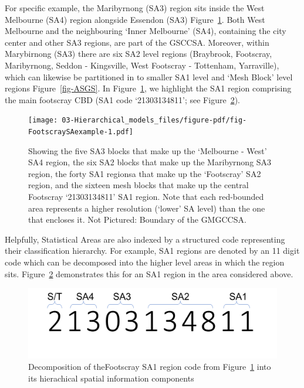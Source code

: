 \documentclass[
  letterpaper,
  DIV=11,
  numbers=noendperiod]{scrreprt}
\begin{document}
For specific example, the Maribyrnong (SA3) region sits inside the West
Melbourne (SA4) region alongside Essendon (SA3)
Figure~\ref{fig-FootscraySAexample}. Both West Melbourne and the
neighbouring `Inner Melbourne' (SA4), containing the city center and
other SA3 regions, are part of the GSCCSA. Moreover, within Marybirnong
(SA3) there are six SA2 level regions (Braybrook, Footscray,
Maribyrnong, Seddon - Kingsville, West Footscray - Tottenham,
Yarraville), which can likewise be partitioned in to smaller SA1 level
and `Mesh Block' level regions Figure~\ref{fig-ASGS}. In
Figure~\ref{fig-FootscraySAexample}, we highlight the SA1 region
comprising the main footscray CBD (SA1 code `21303134811'; see
Figure~\ref{fig-FootscraySA1Code}).

\begin{figure}

{\centering \texttt{[image: 03-Hierarchical\_models\_files/figure-pdf/fig-FootscraySAexample-1.pdf]}

}

\caption{\label{fig-FootscraySAexample}Showing the five SA3 blocks that
make up the `Melbourne - West' SA4 region, the six SA2 blocks that make
up the Maribyrnong SA3 region, the forty SA1 regionsa that make up the
`Footscray' SA2 region, and the sixteen mesh blocks that make up the
central Footscray `21303134811' SA1 region. Note that each red-bounded
area represents a higher resolution (`lower' SA level) than the one that
encloses it. Not Pictured: Boundary of the GMGCCSA.}

\end{figure}

Helpfully, Statistical Areas are also indexed by a structured code
representing their classification hierarchy. For example, SA1 regions
are denoted by an 11 digit code which can be decomposed into the higher
level areas in which the region sits. Figure~\ref{fig-FootscraySA1Code}
demonstrates this for an SA1 region in the area considered above.

\begin{figure}

{\centering \includegraphics{FootscraySA1eg.png}

}

\caption{\label{fig-FootscraySA1Code}Decomposition of theFootscray SA1
region code from Figure~\ref{fig-FootscraySAexample} into its
hierachical spatial information components}

\end{figure}
\end{document}
